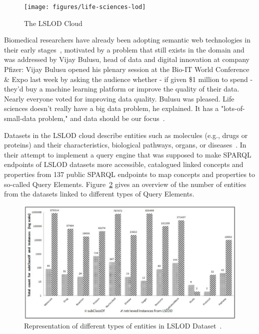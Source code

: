 \documentclass[runningheads]{llncs}
\newenvironment{nbquote} {\quote\interlinepenalty=10000 } {\endquote}
\begin{document}
    \begin{figure}[ht]
        \centering
        \texttt{[image: figures/life-sciences-lod]}
        \caption{The LSLOD Cloud\protect\footnotemark[\value{footnote}]}
        \label{fig:lslod_cloud}
    \end{figure}

    Biomedical researchers have already been adopting semantic web technologies in their early stages~\citep{ashburner2000gene, bodenreider2004unified, wang2005xml}, motivated by a problem that still exists in the domain and was addressed by Vijay Bulusu, head of data and digital innovation at company Pfizer:
    \begin{nbquote}
        Vijay Bulusu opened his plenary session at the Bio-IT World Conference \& Expo last week by asking the audience whether - if given \$1 million to spend - they'd buy a machine learning platform or improve the quality of their data.
        Nearly everyone voted for improving data quality.
        Bulusu was pleased.
        Life sciences doesn't really have a big data problem, he explained.
        It has a "lots-of-small-data problem," and data should be our focus~\citep{Pfizer}.
    \end{nbquote}

    Datasets in the LSLOD cloud describe entities such as molecules (e.g., drugs or proteins) and their characteristics, biological pathways, organs, or diseases~\citep{bodenreider2008biomedical}.
    In their attempt to implement a query engine that was supposed to make SPARQL endpoints of LSLOD datasets more accessible, \citet{kamdar2014roadmap} catalogued linked concepts and properties from 137 public SPARQL endpoints to map concepts and properties to so-called Query Elements.
    Figure~\ref{fig:lslod_entities} gives an overview of the number of entities from the datasets linked to different types of Query Elements.

    \begin{figure}[ht]
        \centering
        \includegraphics[width=\textwidth]{figures/lslod_entities}
        \caption{Representation of different types of entities in LSLOD Dataset~\citep{kamdar2014roadmap}.}
        \label{fig:lslod_entities}
    \end{figure}
\end{document}
